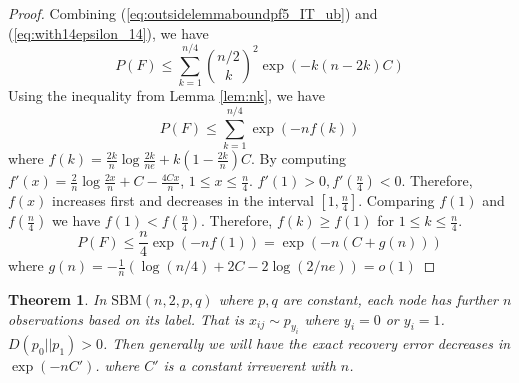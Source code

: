 \documentclass{article}
\newtheorem{theorem}{Theorem}
\begin{document}
\begin{proof}
	Combining (\ref{eq:outsidelemmaboundpf5_IT_ub}) and (\ref{eq:with14epsilon_14}), we have
	\begin{equation}
	P(F) \leq \sum_{k=1}^{n/4} \binom{n/2}{k}^2 \exp(-k(n-2k)C)
	\end{equation}
	Using the inequality from Lemma \ref{lem:nk}, we have
	\begin{equation}\label{eq:Ff}
	P(F) \leq \sum_{k=1}^{n/4} \exp(-nf(k))
	\end{equation}
	where $f(k)= \frac{2k}{n}\log\frac{2k}{ne} + k(1-\frac{2k}{n})C$.
	By computing $f'(x)= \frac{2}{n} \log \frac{2x}{n} + C - \frac{4Cx}{n}$, $1\leq x \leq \frac{n}{4}$.
	$f'(1) > 0 , f'(\frac{n}{4}) < 0$. Therefore, $f(x)$ increases first and decreases in the interval $[1, \frac{n}{4}]$.
	Comparing $f(1)$ and $f(\frac{n}{4})$ we have $f(1) < f(\frac{n}{4})$. Therefore, $f(k) \geq f(1)$ for $1\leq k \leq \frac{n}{4}$.
	\begin{equation}
	P(F) \leq \frac{n}{4}\exp(-nf(1)) = \exp(-n (C+g(n)))
	\end{equation}
	where $g(n) = -\frac{1}{n}(\log (n/4) + 2 C - 2 \log (2/ne)) = o(1)$
\end{proof}
\begin{theorem}
	In $\textrm{SBM}(n, 2, p, q)$ where $p,q$ are constant, each node has further $n$ observations based on its label.
	That is $ x_{ij} \sim p_{y_i}$ where $y_i = 0 $ or $y_i = 1$. $D(p_0 || p_1) > 0$. Then generally we will have
	the exact recovery error decreases in $\exp(-nC')$. where $C'$ is a constant irreverent with $n$.
\end{theorem}
\end{document}
